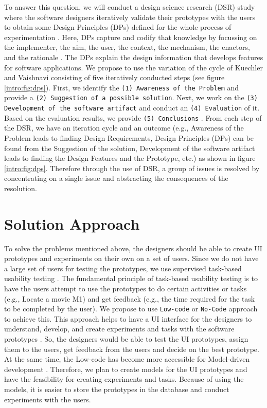 To answer this question, we will conduct a design science research (DSR) study where the software designers iteratively validate their prototypes with the users to obtain some Design Principles (DPs) defined for the whole process of experimentation \cite{paper:designprinciple:vk}. 
Here, DPs capture and codify that knowledge by focussing on the implementer, the aim, the user, the context, the mechanism, the enactors, and the rationale \cite{paper:designprinciple:gregor}. 
The DPs explain the design information that develops features for software applications.
We propose to use the variation of the cycle of Kuechler and Vaishnavi \cite{paper:designprinciple:vk} consisting of five iteratively conducted steps (see figure \ref{intro:fig:dps}). 
First, we identify the 
\texttt{(1) Awareness of the Problem} and provide a
\texttt{(2) Suggestion of a possible solution}. Next, we work on the 
\texttt{(3) Development of the software artifact} and conduct an 
\texttt{(4) Evaluation} of it. Based on the evaluation results, we provide 
\texttt{(5) Conclusions} \cite{misc:crowdsourcing:sg}.
From each step of the DSR, we have an iteration cycle and an outcome (e.g., Awareness of the Problem leads to finding Design Requirements, Design Principles (DPs) can be found from the Suggestion of the solution, Development of the software artifact leads to finding the Design Features and the Prototype, etc.) as shown in figure \ref{intro:fig:dps}.
Therefore through the use of DSR, a group of issues is resolved by concentrating on a single issue and abstracting the consequences of the resolution.


\section{Solution Approach}
\label{intro:section:solution}
To solve the problems mentioned above, the designers should be able to create UI prototypes and experiments on their own on a set of users.
Since we do not have a large set of users for testing the prototypes, we use supervised task-based usability testing \cite{article:dataanalysis:supervisedtest}.
The fundamental principle of task-based usability testing is to have the users attempt to use the prototypes to do certain activities or tasks (e.g., Locate a movie M1) and get feedback (e.g., the time required for the task to be completed by the user).
We propose to use \texttt{Low-code} or \texttt{No-Code} approach to achieve this.
This approach helps to have a UI interface for the designers to understand, develop, and create experiments and tasks with the software prototypes \cite{paper:lowcode:khorram}.
So, the designers would be able to test the UI prototypes, assign them to the users, get feedback from the users and decide on the best prototype.
At the same time, the Low-code has become more accessible for Model-driven development \cite{article:lowcode:modeldriven}.
Therefore, we plan to create models for the UI prototypes and have the feasibility for creating experiments and tasks. 
Because of using the models, it is easier to store the prototypes in the database and conduct experiments with the users. 

